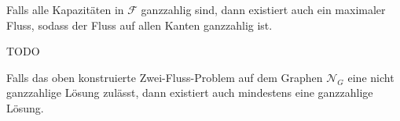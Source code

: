 


\begin{theorem}\label{ift}

Falls alle Kapazitäten in $\mathcal{F}$ ganzzahlig sind, dann existiert auch ein maximaler Fluss, sodass der Fluss auf allen Kanten ganzzahlig ist.

\end{theorem}

\begin{theorem}\label{mfmc}

TODO

\end{theorem}

\begin{theorem}

Falls das oben konstruierte Zwei-Fluss-Problem auf dem Graphen $\mathcal{N}_G$ eine nicht ganzzahlige Lösung zulässt, dann existiert auch mindestens eine ganzzahlige Lösung.

\end{theorem}

